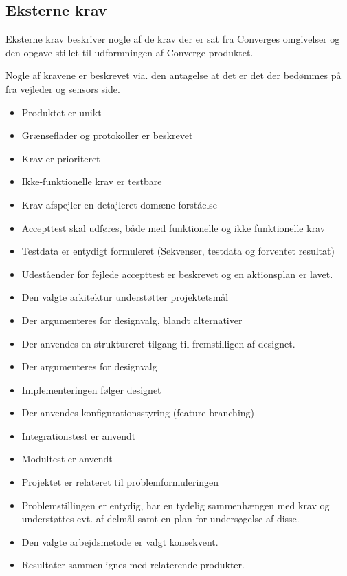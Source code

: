 \subsection{Eksterne krav}

Eksterne krav beskriver nogle af de krav der er sat fra Converges omgivelser og den opgave stillet til udformningen af Converge produktet.

Nogle af kravene er beskrevet via. den antagelse at det er det der bedømmes på fra vejleder og sensors side.


\begin{itemize}
  \item Produktet er unikt
  \item Grænseflader og protokoller er beskrevet
  \item Krav er prioriteret
  \item Ikke-funktionelle krav er testbare
  \item Krav afspejler en detajleret domæne forståelse 
  \item Accepttest skal udføres, både med funktionelle og ikke funktionelle krav
  \item Testdata er entydigt formuleret (Sekvenser, testdata og forventet resultat)
  \item Udeståender for fejlede accepttest er beskrevet og en aktionsplan er lavet. 
  \item Den valgte arkitektur understøtter projektetsmål
  \item Der argumenteres for designvalg, blandt alternativer 
  \item Der anvendes en struktureret tilgang til fremstilligen af designet.
  \item Der argumenteres for designvalg
  \item Implementeringen følger designet
  \item Der anvendes konfigurationsstyring (feature-branching)
  \item Integrationstest er anvendt
  \item Modultest er anvendt
  \item Projektet er relateret til problemformuleringen
  \item Problemstillingen er entydig, har en tydelig sammenhængen med krav og understøttes evt. af delmål samt en plan for undersøgelse af disse.
  \item Den valgte arbejdsmetode er valgt konsekvent.
  \item Resultater sammenlignes med relaterende produkter.
\end{itemize}